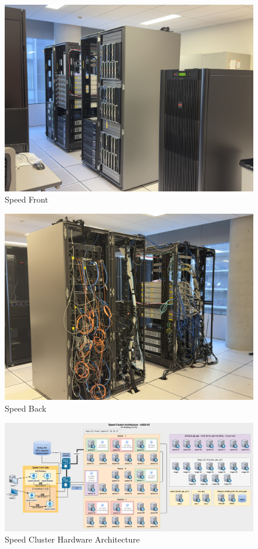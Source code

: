 \begin{figure}[htbp]
    \centering
    \includegraphics[width=0.9\columnwidth]{images/speed2.jpg}
    \caption{Speed Front}
    \label{fig:speed-front}
\end{figure}
\vspace{-1em}
\begin{figure}[htbp]
    \centering
    \includegraphics[width=0.9\columnwidth]{images/speed1.jpg}
    \caption{Speed Back}
    \label{fig:speed-back}
\end{figure}
\vspace{-1em}
\begin{figure}[htpb]
	\centering
	\includegraphics[width=\columnwidth]{images/SpeedArchitecture-March 2025.jpg}
	\caption{Speed Cluster Hardware Architecture}
	\label{fig:speed-architecture}
\end{figure}
